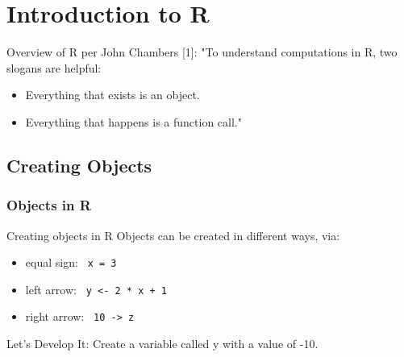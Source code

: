 \section{Introduction to R}
\begin{frame}
	\begin{center}
  		\begin{block}{Overview of R per John Chambers [1]:} 
			"To understand computations in R, two slogans are helpful:
			\begin{itemize}
			        \item Everything that exists is an object.
			        \item Everything that happens is a function call."
			\end{itemize}
		\end{block}
	\end{center} 

\end{frame}

\subsection{Creating Objects}
\begin{frame}[allowframebreaks]
	\frametitle{Objects in R}
		\begin{block}{Creating objects in R}
Objects can be created in different ways, via:
			\begin{itemize}
				\item equal sign: \lstinline$ x = 3 $
				\item left arrow: \lstinline$ y <- 2 * x + 1 $
				\item right arrow: \lstinline$ 10 -> z $
			\end{itemize}
		\end{block}

\newpage
	\begin{alertblock}{Let's Develop It:}
		Create a variable called y with a value of -10.
	\end{alertblock}
\end{frame}

